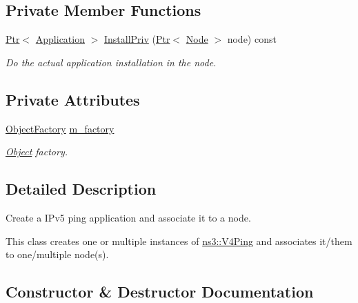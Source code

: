 \subsection*{Private Member Functions}
\begin{DoxyCompactItemize}
\item 
\hyperlink{classns3_1_1Ptr}{Ptr}$<$ \hyperlink{classns3_1_1Application}{Application} $>$ \hyperlink{classns3_1_1V4PingHelper_ac1e337798f860d0a311ae6c75c43bb43}{Install\+Priv} (\hyperlink{classns3_1_1Ptr}{Ptr}$<$ \hyperlink{classns3_1_1Node}{Node} $>$ node) const 
\begin{DoxyCompactList}\small\item\em Do the actual application installation in the node. \end{DoxyCompactList}\end{DoxyCompactItemize}
\subsection*{Private Attributes}
\begin{DoxyCompactItemize}
\item 
\hyperlink{classns3_1_1ObjectFactory}{Object\+Factory} \hyperlink{classns3_1_1V4PingHelper_a33fad67853c8c148e08929f37deb2212}{m\+\_\+factory}
\begin{DoxyCompactList}\small\item\em \hyperlink{classns3_1_1Object}{Object} factory. \end{DoxyCompactList}\end{DoxyCompactItemize}


\subsection{Detailed Description}
Create a I\+Pv5 ping application and associate it to a node. 

This class creates one or multiple instances of \hyperlink{classns3_1_1V4Ping}{ns3\+::\+V4\+Ping} and associates it/them to one/multiple node(s). 

\subsection{Constructor \& Destructor Documentation}
